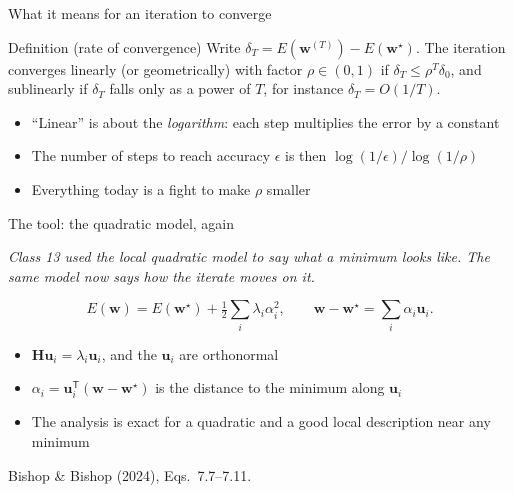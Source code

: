 \documentclass[aspectratio=169, 11pt]{beamer}
\newcommand{\bridge}[1]{%
  {\scriptsize\itshape\color{mcMuted} #1\par}\vspace{0.35em}}
\newcommand{\srcline}[1]{%
  \par\vspace{0.25em}%
  {\scriptsize\color{mcMuted}\hfill #1\par}}
\newcommand{\src}[3]{}      %
\newcommand{\nosrc}{}       %
\begin{document}
\begin{frame}{What it means for an iteration to converge}
  \nosrc
  \begin{block}{Definition (rate of convergence)}
    Write $\delta_T = E(\mathbf{w}^{(T)}) - E(\mathbf{w}^\star)$. The iteration converges
    \alert{linearly} (or geometrically) with factor $\rho \in (0,1)$ if
    $\delta_{T} \leq \rho^{T} \delta_0$, and \alert{sublinearly} if
    $\delta_T$ falls only as a power of $T$, for instance
    $\delta_T = O(1/T)$.
  \end{block}
  \vspace{0.4em}
  \begin{itemize}\itemsep0.4em
    \item ``Linear'' is about the \emph{logarithm}: each step multiplies
          the error by a constant
    \item The number of steps to reach accuracy $\epsilon$ is then
          $\log(1/\epsilon) / \log(1/\rho)$
    \item Everything today is a fight to make $\rho$ smaller
  \end{itemize}
\end{frame}

\begin{frame}{The tool: the quadratic model, again}
  \src{bishop2024}{equation}{7.7-7.11}
  \src{bishop2024}{section}{7.1.1}
  \bridge{Class 13 used the local quadratic model to say what a minimum
  looks like. The same model now says how the iterate moves on it.}
  \vspace{-0.2em}
  \[
    E(\mathbf{w}) = E(\mathbf{w}^\star) + \tfrac12 \sum_i \lambda_i \alpha_i^2 ,
    \qquad \mathbf{w} - \mathbf{w}^\star = \sum_i \alpha_i \mathbf{u}_i .
  \]
  \vspace{-0.6em}
  \begin{itemize}\itemsep0.35em
    \item $\mathbf{H} \mathbf{u}_i = \lambda_i \mathbf{u}_i$, and the $\mathbf{u}_i$ are orthonormal
    \item $\alpha_i = \mathbf{u}_i^{\mathsf T}(\mathbf{w} - \mathbf{w}^\star)$ is the distance to
          the minimum along $\mathbf{u}_i$
    \item The analysis is exact for a quadratic and a good local
          description near any minimum
  \end{itemize}
  \srcline{Bishop \& Bishop (2024), Eqs.~7.7--7.11.}
\end{frame}

\end{document}
